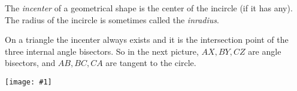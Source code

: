 \documentclass[12pt]{article}
\newcommand{\figura}[1]{\begin{center}\texttt{[image: \#1]}\end{center}}
\begin{document}
The \emph{incenter} of a geometrical shape is the center of the
incircle (if it has any).  The radius of the incircle is sometimes
called the \emph{inradius}.

On a triangle the incenter always exists and it is the intersection
point of the three internal angle bisectors. So in the next picture,
$AX,BY,CZ$ are angle bisectors, and $AB,BC,CA$ are tangent to the
circle.
\figura{incentre}

\end{document}
